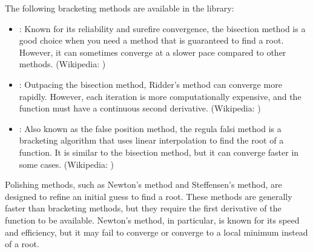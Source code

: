 \documentclass[letterpaper,10pt,english]{sphinxmanual}
\begin{document}
\sphinxAtStartPar
The following bracketing methods are available in the library:
\begin{itemize}
\item {} 
\sphinxAtStartPar
{}: Known for its reliability and surefire convergence, the bisection method is a good choice when you need a method that is guaranteed to find a root. However, it can sometimes converge at a slower pace compared to other methods. (Wikipedia: )

\item {} 
\sphinxAtStartPar
{}: Outpacing the bisection method, Ridder’s method can converge more rapidly. However, each iteration is more computationally expensive, and the function must have a continuous second derivative. (Wikipedia: )

\item {} 
\sphinxAtStartPar
{}: Also known as the false position method, the regula falsi method is a bracketing algorithm that uses linear interpolation to find the root of a function. It is similar to the bisection method, but it can converge faster in some cases. (Wikipedia: )

\end{itemize}

\sphinxAtStartPar
Polishing methods, such as Newton’s method and Steffensen’s method, are designed to refine an initial guess to find a root. These methods are generally faster than bracketing methods, but they require the first derivative of the function to be available. Newton’s method, in particular, is known for its speed and efficiency, but it may fail to converge or converge to a local minimum instead of a root.
\end{document}

